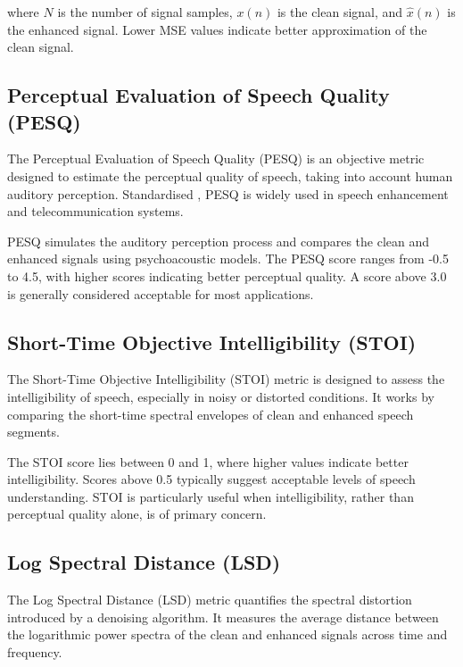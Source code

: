 where \( N \) is the number of signal samples, \( x(n) \) is the clean signal, and \( \hat{x}(n) \) is the enhanced signal. Lower MSE values indicate better approximation of the clean signal.

\subsection{Perceptual Evaluation of Speech Quality (PESQ)}
\label{subsec:pesq}

The Perceptual Evaluation of Speech Quality (PESQ) is an objective metric designed to estimate the perceptual quality of speech, taking into account human auditory perception. Standardised \cite{itutp862}, PESQ is widely used in speech enhancement and telecommunication systems.

PESQ simulates the auditory perception process and compares the clean and enhanced signals using psychoacoustic models. The PESQ score ranges from -0.5 to 4.5, with higher scores indicating better perceptual quality. A score above 3.0 is generally considered acceptable for most applications.

\subsection{Short-Time Objective Intelligibility (STOI)}
\label{subsec:stoi}

The Short-Time Objective Intelligibility (STOI) metric is designed to assess the intelligibility of speech, especially in noisy or distorted conditions. It works by comparing the short-time spectral envelopes of clean and enhanced speech segments.

The STOI score lies between 0 and 1, where higher values indicate better intelligibility. Scores above 0.5 typically suggest acceptable levels of speech understanding. STOI is particularly useful when intelligibility, rather than perceptual quality alone, is of primary concern.

\subsection{Log Spectral Distance (LSD)}
\label{subsec:lsd}

The Log Spectral Distance (LSD) metric quantifies the spectral distortion introduced by a denoising algorithm. It measures the average distance between the logarithmic power spectra of the clean and enhanced signals across time and frequency.

